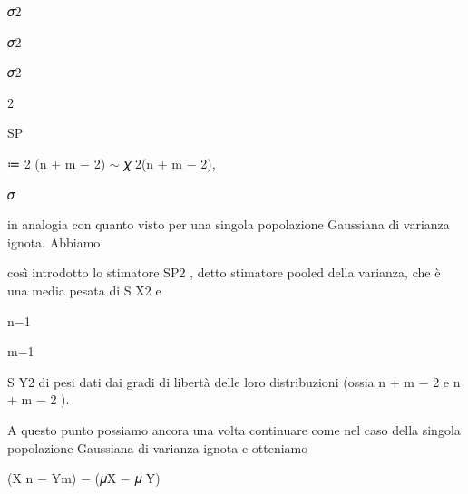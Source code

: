 \documentclass[a4paper,portrait,12pt]{article}
\begin{document}
\begin{flushleft}
𝜎2
\end{flushleft}


\begin{flushleft}
𝜎2
\end{flushleft}


\begin{flushleft}
𝜎2
\end{flushleft}


2


\begin{flushleft}
SP
\end{flushleft}


\begin{flushleft}
≔ 2 (n + m $-$ 2) $\sim$ 𝜒 2(n + m $-$ 2),
\end{flushleft}


\begin{flushleft}
𝜎
\end{flushleft}





\begin{flushleft}
in analogia con quanto visto per una singola popolazione Gaussiana di varianza ignota. Abbiamo
\end{flushleft}


\begin{flushleft}
così introdotto lo stimatore SP2 , detto stimatore pooled della varianza, che \`{e} una media pesata di S X2 e
\end{flushleft}


\begin{flushleft}
n$-$1
\end{flushleft}


\begin{flushleft}
m$-$1
\end{flushleft}


\begin{flushleft}
S Y2 di pesi dati dai gradi di libert\`{a} delle loro distribuzioni (ossia n + m $-$ 2 e n + m $-$ 2 ).
\end{flushleft}


\begin{flushleft}
A questo punto possiamo ancora una volta continuare come nel caso della singola popolazione Gaussiana di varianza ignota e otteniamo
\end{flushleft}


\begin{flushleft}
(X n $-$ Ym) $-$ (𝜇X $-$ 𝜇 Y)
\end{flushleft}
\end{document}

